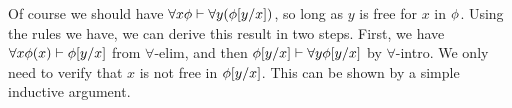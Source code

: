    \begin{example} Of course we should have
     $\forall x\phi \vdash \forall y(\phi [y/x])$, so long as $y$ is
     free for $x$ in $\phi$.  Using the rules we have, we can derive
     this result in two steps.  First, we have
     $\forall x\phi (x)\vdash \phi [y/x]$ from $\forall$-elim, and then
     $\phi [y/x]\vdash \forall y\phi [y/x]$ by $\forall$-intro.  We only
     need to verify that $x$ is not free in $\phi [y/x]$.  This can be
     shown by a simple inductive argument.   \end{example}






